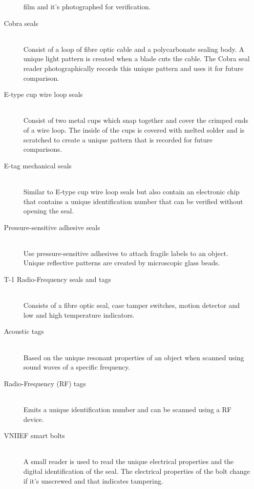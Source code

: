 \documentclass[twoside,titlepage,11pt,twocolumn,a4paper]{article}
\begin{document}
\begin{description}
    film and it’s photographed for verification.
  \item[Cobra seals] \hfill \\ Consist of a loop of fibre optic cable
    and a polycarbonate sealing body. A unique light pattern is
    created when a blade cuts the cable. The Cobra seal reader
    photographically records this unique pattern and uses it for
    future comparison.
  \item[E-type cup wire loop seals] \hfill \\ Consist of two metal
    cups which snap together and cover the crimped ends of a wire
    loop. The inside of the cups is covered with melted solder and is
    scratched to create a unique pattern that is recorded for future
    comparisons.
  \item[E-tag mechanical seals] \hfill \\ Similar to E-type cup wire
    loop seals but also contain an electronic chip that contains a
    unique identification number that can be verified without opening
    the seal.
  \item[Pressure-sensitive adhesive seals] \hfill \\ Use
    pressure-sensitive adhesives to attach fragile labels to an
    object. Unique reflective patterns are created by microscopic
    glass beads.
  \item[T-1 Radio-Frequency seals and tags] \hfill \\ Consists of a
    fibre optic seal, case tamper switches, motion detector and low
    and high temperature indicators.
  \item[Acoustic tags] \hfill \\ Based on the unique resonant
    properties of an object when scanned using sound waves of a
    specific frequency.
  \item[Radio-Frequency (RF) tags] \hfill \\ Emits a unique
    identification number and can be scanned using a RF device.
  \item[VNIIEF smart bolts] \hfill \\ A small reader is used to read
    the unique electrical properties and the digital identification of
    the seal. The electrical properties of the bolt change if it’s
    unscrewed and that indicates tampering.
\end{description}
\end{document}
